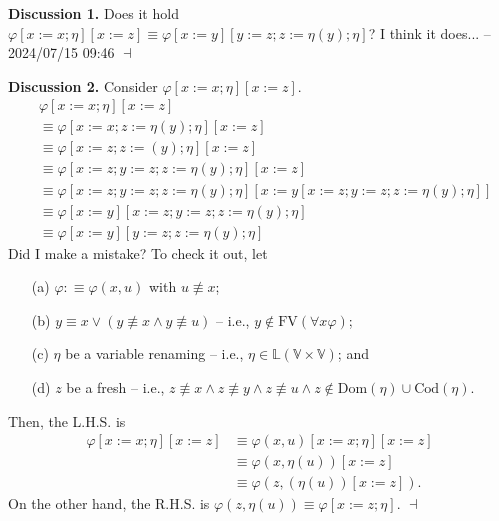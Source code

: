 \documentclass[12pt]{paper}
\newenvironment{context}[1][]
{ \noindent \textbf{{#1}.} }
{ \hfill $ \dashv $ }
\begin{document}
\begin{context}[Discussion 1]
Does it hold $\varphi \left[ x := x ; \eta \right] \left[ x := z \right] \equiv \varphi \left[ x := y \right] \left[ y := z ; z := \eta \left( y \right) ; \eta \right]$? \newline
I think it does... -- 2024/07/15 09:46 
\end{context}

\newpage

\begin{context}[Discussion 2]
Consider $\varphi \left[ x := x ; \eta \right] \left[ x := z \right]$.
\begin{align*}
& \varphi \left[ x := x ; \eta \right] \left[ x := z \right] \\
& \equiv \varphi \left[ x := x ; z := \eta \left( y \right) ; \eta \right] \left[ x := z \right] \\
& \equiv \varphi \left[ x := z ; z := \left( y \right) ; \eta \right] \left[ x := z \right] \\
& \equiv \varphi \left[ x := z ; y := z ; z := \eta \left( y \right) ; \eta \right] \left[ x := z \right] \\
& \equiv \varphi \left[ x := z ; y := z ; z := \eta \left( y \right) ; \eta \right] \left[ x := y \left[ x := z ; y := z ; z := \eta \left( y \right) ; \eta \right] \right] \\
& \equiv \varphi \left[ x := y \right] \left[ x := z ; y := z ; z := \eta \left( y \right) ; \eta \right] \\
& \equiv \varphi \left[ x := y \right] \left[ y := z ; z := \eta \left( y \right) ; \eta \right]
\end{align*}
Did I make a mistake? To check it out, let
\begin{enumerate}
\item [(a)] $ \varphi : \equiv \varphi \left( x , u \right)$ with $ u \not\equiv x $;
\item [(b)] $ y \equiv x \lor \left( y \not\equiv x \land y \not\equiv u \right) $ -- i.e., $ y \notin \mathrm{FV} \left( \forall x \varphi \right) $;
\item [(c)] $\eta$ be a variable renaming -- i.e., $ \eta \in \mathbb{L} \left( \mathbb{V} \times \mathbb{V} \right) $; and
\item [(d)] $z$ be a fresh -- i.e., $z \not\equiv x \land z \not\equiv y \land z \not\equiv u \land z \notin \mathrm{Dom} \left( \eta \right) \cup \mathrm{Cod} \left( \eta \right)$.
\end{enumerate}
Then, the L.H.S. is
\begin{align*}
\varphi \left[ x := x ; \eta \right] \left[ x := z \right]
& \equiv \varphi \left( x , u \right) \left[ x := x ; \eta \right] \left[ x := z \right] \\
& \equiv \varphi \left( x , \eta \left( u \right) \right) \left[ x := z \right] \\
& \equiv \varphi \left( z , \left( \eta \left( u \right) \right) \left[ x := z \right] \right) .
\end{align*}
On the other hand, the R.H.S. is $\varphi \left( z , \eta \left( u \right) \right) \equiv \varphi \left[ x := z ; \eta \right]$.
\end{context}
\end{document}
